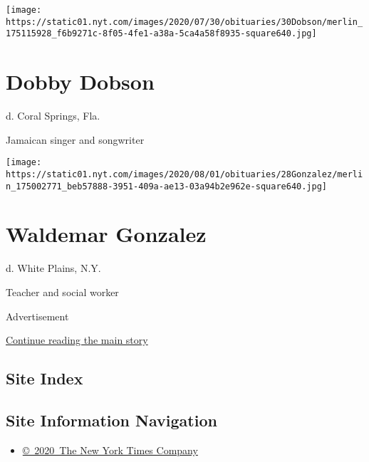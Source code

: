 \texttt{[image: https://static01.nyt.com/images/2020/07/30/obituaries/30Dobson/merlin\_175115928\_f6b9271c-8f05-4fe1-a38a-5ca4a58f8935-square640.jpg]}

\hypertarget{dobby-dobson}{%
\section{Dobby Dobson}\label{dobby-dobson}}

d. Coral Springs, Fla.

Jamaican singer and songwriter

\texttt{[image: https://static01.nyt.com/images/2020/08/01/obituaries/28Gonzalez/merlin\_175002771\_beb57888-3951-409a-ae13-03a94b2e962e-square640.jpg]}

\hypertarget{waldemar-gonzalez}{%
\section{Waldemar Gonzalez}\label{waldemar-gonzalez}}

d. White Plains, N.Y.

Teacher and social worker

Advertisement

\protect\hyperlink{after-bottom}{Continue reading the main story}

\hypertarget{site-index}{%
\subsection{Site Index}\label{site-index}}

\hypertarget{site-information-navigation}{%
\subsection{Site Information
Navigation}\label{site-information-navigation}}

\begin{itemize}
\tightlist
\item
  \href{https://help.nytimes.com/hc/en-us/articles/115014792127-Copyright-notice}{©~2020~The
  New York Times Company}
\end{itemize}

